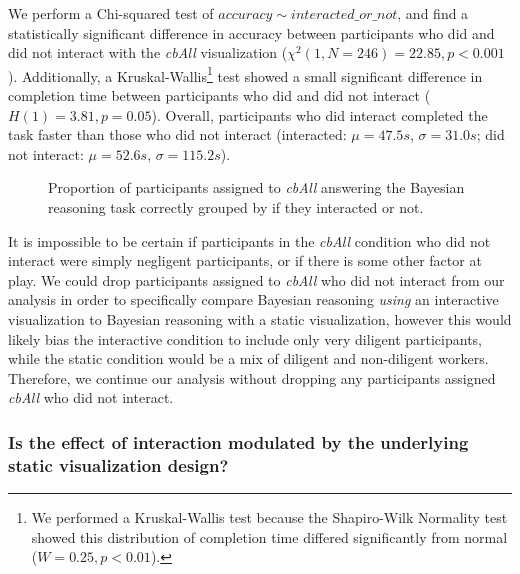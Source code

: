 We perform a Chi-squared test of $accuracy \sim interacted\_or\_not$, and find a statistically significant difference in accuracy between participants who did and did not interact with the \textit{cbAll} visualization ($\chi^2(1, N = 246) = 22.85, p < 0.001$). Additionally, a Kruskal-Wallis\footnote{We performed a Kruskal-Wallis test because the Shapiro-Wilk Normality test showed this distribution of completion time differed significantly from normal ($W = 0.25, p < 0.01$).} test showed a small significant difference in completion time between participants who did and did not interact ($H(1) = 3.81, p = 0.05$). Overall, participants who did interact completed the task faster than those who did not interact (interacted: $\mu = 47.5s$, $\sigma = 31.0s$; did not interact: $\mu = 52.6s$, $\sigma = 115.2s$). 

\begin{figure}[h!]
    \centering
    \caption{Proportion of participants assigned to \textit{cbAll} answering the Bayesian reasoning task correctly grouped by if they interacted or not.}
    \label{fig:exp1_interacted_vs_did_not}
\end{figure}

It is impossible to be certain if participants in the \textit{cbAll} condition who did not interact were simply negligent participants, or if there is some other factor at play. We could drop participants assigned to \textit{cbAll} who did not interact from our analysis in order to specifically compare Bayesian reasoning \textit{using} an interactive visualization to Bayesian reasoning with a static visualization, however this would likely bias the interactive condition to include only very diligent participants, while the static condition would be a mix of diligent and non-diligent workers. Therefore, we continue our analysis without dropping any participants assigned \textit{cbAll} who did not interact. 

\subsubsection{Is the effect of interaction modulated by the underlying static visualization design?}

